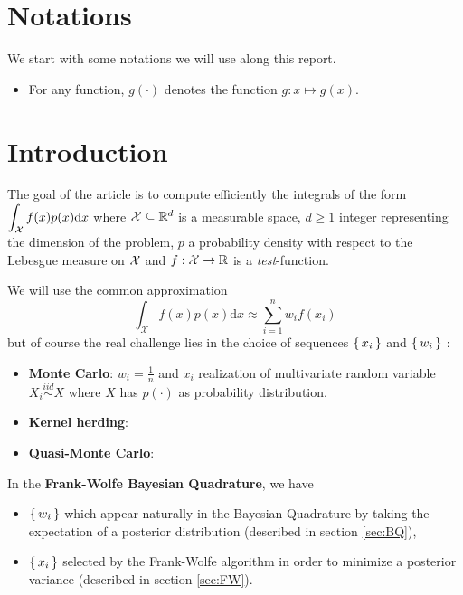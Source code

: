 \section*{Notations}
We start with some notations we will use along this report.
\begin{itemize}[font= \color{blue} \large, label= $\bullet$]
 \item For any function, $g(\cdot)$ denotes the function $g: x \mapsto g(x)$.
\end{itemize}

\section*{Introduction}

The goal of the article \cite{FWBQ} is to compute efficiently the integrals of the form
$ \displaystyle \int _ { \mathcal{X} } f ( x ) p ( x ) \mathrm { d } x$
where $\mathcal{X} \subseteq \mathbb{R} ^ { d }$ is a measurable space,
$d \geq 1$ integer representing the dimension of the problem, $p$ a probability
density with respect to the Lebesgue measure on $\mathcal{X}$ and $f : \mathcal{X} \rightarrow \mathbb{R}$
 is a \textit{test}-function.

 We will use the common approximation
 \begin{equation}
\int _ { \mathcal { X } } f ( x ) p ( x ) \mathrm { d } x \approx \sum _ { i = 1 } ^ { n } w _ { i } f \left( x _ { i } \right)
 \end{equation}
 but of course the real challenge lies in the choice of sequences $\left \{ \, x_i \, \right \}$ and
 $\left \{ \, w_i \, \right \}$ :
  \begin{itemize}[font= \color{blue} \large, label= $\bullet$]
    \item \textbf{Monte Carlo}: $w_i = \frac{1}{n}$ and $x_i$ realization of multivariate
    random variable $X_i \stackrel{iid}{\sim} X$ where $X$ has $p(\cdot)$ as probability
    distribution.
    \item \textbf{Kernel herding}:
    \item \textbf{Quasi-Monte Carlo}:
  \end{itemize}

  In the \textbf{Frank-Wolfe Bayesian Quadrature}, we have
  \begin{itemize}[font= \color{blue} \large, label= ]
\item $\left \{ \, w_i \, \right \}$ which appear naturally in the Bayesian Quadrature by taking the expectation of a posterior distribution  (described in section \ref{sec:BQ}),
\item $\left \{ \, x_i \, \right \}$ selected by the Frank-Wolfe algorithm in order to minimize a posterior variance (described in section \ref{sec:FW}).
  \end{itemize}

